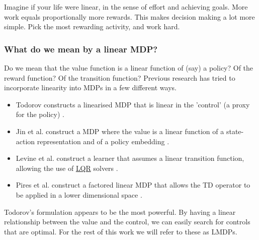 
Imagine if your life were linear, in the sense of effort and achieving goals.
More work equals proportionally more rewards. This makes decision making
a lot more simple. Pick the most rewarding activity, and work hard.

\subsubsection{What do we mean by a linear MDP?}

Do we mean that the value function is a linear function of (say) a policy?
Of the reward function? Of the transition function? Previous research has tried to incorporate
linearity into MDPs in a few different ways.

\begin{itemize}
  \tightlist
  \item Todorov constructs a linearised MDP that is linear in the 'control' (a proxy for the policy) \cite{Todorov2006}.
  \item Jin et al. construct a MDP where the value is a linear function of a state-action representation and of a policy embedding \cite{Wang}.
  \item Levine et al. construct a learner that assumes a linear transition function, allowing the use of \href{https://en.wikipedia.org/wiki/Linear%E2%80%93quadratic_regulator}{LQR} solvers \cite{Levine2019}.
  \item Pires et al. construct a factored linear MDP that allows the TD operator to be applied in a lower dimensional space \cite{Pires2016}.
\end{itemize}

Todorov's formulation appears to be the most powerful. By having a linear
relationship between the value and the control, we can easily search for controls that
are optimal. For the rest of this work we will refer to these as LMDPs.


